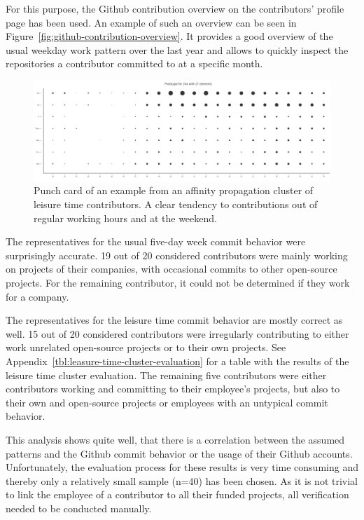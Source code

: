 For this purpose, the Github contribution overview on the contributors' profile page has been used.
An example of such an overview can be seen in Figure~\ref{fig:github-contribution-overview}.
It provides a good overview of the usual weekday work pattern over the last year and allows to quickly inspect the repositories a contributor committed to at a specific month.

\begin{figure}[H]
    \includegraphics[scale=0.32]{./graphs/analysis-affinity/204}
    \centering
    \caption{Punch card of an example from an affinity propagation cluster of leisure time contributors. A clear tendency to contributions out of regular working hours and at the weekend.}\label{fig:leisure-time-hours}
\end{figure}

The representatives for the usual five-day week commit behavior were surprisingly accurate.
19 out of 20 considered contributors were mainly working on projects of their companies, with occasional commits to other open-source projects.
For the remaining contributor, it could not be determined if they work for a company.

The representatives for the leisure time commit behavior are mostly correct as well.
15 out of 20 considered contributors were irregularly contributing to either work unrelated open-source projects or to their own projects.
See Appendix~\ref{tbl:leasure-time-cluster-evaluation} for a table with the results of the leisure time cluster evaluation.
The remaining five contributors were either contributors working and committing to their employee's projects, but also to their own and open-source projects or employees with an untypical commit behavior.

This analysis shows quite well, that there is a correlation between the assumed patterns and the Github commit behavior or the usage of their Github accounts.
Unfortunately, the evaluation process for these results is very time consuming and thereby only a relatively small sample (n=40) has been chosen.
As it is not trivial to link the employee of a contributor to all their funded projects, all verification needed to be conducted manually.

